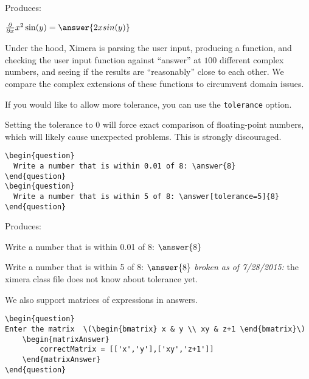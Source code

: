 \documentclass{ximera}
\begin{document}
Produces:

\begin{question}
  $\frac{\partial}{\partial x} x^2\sin(y) = \answer{2xsin(y)}$
\end{question}

\begin{remark}
Under the hood, Ximera is parsing the user input, producing a
function, and checking the user input function against ``answer'' at
$100$ different complex numbers, and seeing if the results are
``reasonably'' close to each other.  We compare the complex extensions
of these functions to circumvent domain issues.
\end{remark}

If you would like to allow more tolerance, you can use the \verb!tolerance! option. 

\begin{warning}
Setting the tolerance to 0 will force exact comparison of floating-point numbers, which will likely cause unexpected problems. This is strongly discouraged. 
\end{warning}

\begin{verbatim}
\begin{question}
  Write a number that is within 0.01 of 8: \answer{8}
\end{question}
\begin{question}
  Write a number that is within 5 of 8: \answer[tolerance=5]{8}
\end{question}
\end{verbatim}

Produces:

\begin{question}
  Write a number that is within 0.01 of 8: $\answer{8}$
\end{question}
\begin{question}
  Write a number that is within 5 of 8: $\answer{8}$  \emph{broken as of 7/28/2015:} the ximera class file does not know about tolerance yet.
\end{question}

We also support matrices of expressions in answers.

\begin{verbatim}
\begin{question}
Enter the matrix  \(\begin{bmatrix} x & y \\ xy & z+1 \end{bmatrix}\)
    \begin{matrixAnswer}
	    correctMatrix = [['x','y'],['xy','z+1']]
    \end{matrixAnswer}
\end{question}
\end{verbatim}
\end{document}
